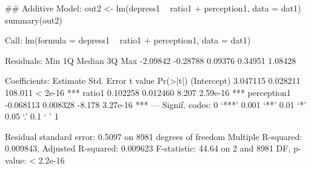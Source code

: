 \begin{Schunk}
\begin{Sinput}
 ## Additive Model:
 out2 <- lm(depress1 ~ ratio1 + perception1, data = dat1)
 summary(out2)
\end{Sinput}
\begin{Soutput}
Call:
lm(formula = depress1 ~ ratio1 + perception1, data = dat1)

Residuals:
     Min       1Q   Median       3Q      Max 
-2.09842 -0.28788  0.09376  0.34951  1.08428 

Coefficients:
             Estimate Std. Error t value Pr(>|t|)    
(Intercept)  3.047115   0.028211 108.011  < 2e-16 ***
ratio1       0.102258   0.012460   8.207 2.59e-16 ***
perception1 -0.068113   0.008328  -8.178 3.27e-16 ***
---
Signif. codes:  0 ‘***’ 0.001 ‘**’ 0.01 ‘*’ 0.05 ‘.’ 0.1 ‘ ’ 1

Residual standard error: 0.5097 on 8981 degrees of freedom
Multiple R-squared:  0.009843,	Adjusted R-squared:  0.009623 
F-statistic: 44.64 on 2 and 8981 DF,  p-value: < 2.2e-16
\end{Soutput}
\end{Schunk}
